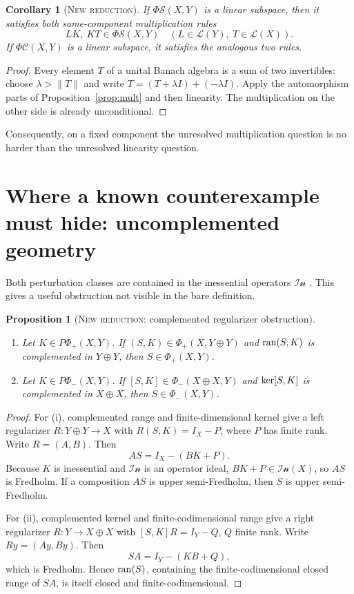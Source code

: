 \documentclass[11pt]{article}
\newtheorem{proposition}[theorem]{Proposition}
\newtheorem{corollary}[theorem]{Corollary}
\theoremstyle{definition}
\newcommand{\Lop}{\mathcal L}
\newcommand{\Iness}{\mathcal{In}}
\newcommand{\PhiS}{\Phi\mathcal S}
\newcommand{\PhiC}{\Phi\mathcal C}
\newcommand{\PhiP}{\Phi_+}
\newcommand{\PhiM}{\Phi_-}
\newcommand{\PPhiP}{P\Phi_+}
\newcommand{\PPhiM}{P\Phi_-}
\newcommand{\ran}{\mathop{\rm ran}}
\newcommand{\kerop}{\mathop{\rm ker}}
\newcommand{\newresult}{\textcolor{newblue}{\textsc{New reduction}}}
\begin{document}
\begin{corollary}[\newresult]\label{cor:linear-mult}
If \(\PhiS(X,Y)\) is a linear subspace, then it satisfies both same-component
multiplication rules
\[
 LK,\ KT\in\PhiS(X,Y)
 \quad(L\in\Lop(Y),\ T\in\Lop(X)).
\]
If \(\PhiC(X,Y)\) is a linear subspace, it satisfies the analogous two rules.
\end{corollary}

\begin{proof}
Every element \(T\) of a unital Banach algebra is a sum of two invertibles: choose
\(\lambda>\|T\|\) and write
\(T=(T+\lambda I)+(-\lambda I)\).  Apply the automorphism parts of
Proposition~\ref{prop:mult} and then linearity.  The multiplication on the other side is
already unconditional.
\end{proof}

Consequently, on a fixed component the unresolved multiplication question is no harder
than the unresolved linearity question.

\section{Where a known counterexample must hide: uncomplemented geometry}

Both perturbation classes are contained in the inessential operators
\(\Iness\) \cite{Aiena2012}.  This gives a useful obstruction not visible in the bare
definition.

\begin{proposition}[\newresult: complemented regularizer obstruction]\label{prop:comp}
\begin{enumerate}[label=\rm(\roman*)]
\item Let \(K\in\PPhiP(X,Y)\).  If \((S,K)\in\PhiP(X,Y\oplus Y)\) and
\(\ran(S,K)\) is complemented in \(Y\oplus Y\), then \(S\in\PhiP(X,Y)\).
\item Let \(K\in\PPhiM(X,Y)\).  If \([S,K]\in\PhiM(X\oplus X,Y)\) and
\(\kerop[S,K]\) is complemented in \(X\oplus X\), then \(S\in\PhiM(X,Y)\).
\end{enumerate}
\end{proposition}

\begin{proof}
For (i), complemented range and finite-dimensional kernel give a left regularizer
\(R\colon Y\oplus Y\to X\) with
\(R(S,K)=I_X-P\), where \(P\) has finite rank.  Write \(R=(A,B)\).  Then
\[
 AS=I_X-(BK+P).
\]
Because \(K\) is inessential and \(\Iness\) is an operator ideal,
\(BK+P\in\Iness(X)\), so \(AS\) is Fredholm.  If a composition \(AS\) is upper
semi-Fredholm, then \(S\) is upper semi-Fredholm.

For (ii), complemented kernel and finite-codimensional range give a right regularizer
\(R\colon Y\to X\oplus X\) with \([S,K]R=I_Y-Q\), \(Q\) finite rank.  Write
\(Ry=(Ay,By)\).  Then
\[
 SA=I_Y-(KB+Q),
\]
which is Fredholm.  Hence \(\ran(S)\), containing the finite-codimensional closed range
of \(SA\), is itself closed and finite-codimensional.
\end{proof}
\end{document}
